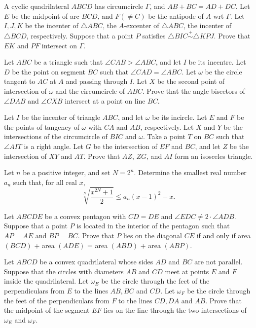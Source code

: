 \documentclass[11pt]{scrartcl}
\begin{document}
\begin{problem}[571352513856417722]
	A cyclic quadrilateral $ABCD$ has circumcircle $\Gamma$, and $AB+BC=AD+DC$. Let $E$ be the midpoint of arc $BCD$, and $F (\neq C)$ be the antipode of $A$ wrt $\Gamma$. Let $I,J,K$ be the incenter of $\triangle ABC$, the $A$-excenter of $\triangle ABC$, the incenter of $\triangle BCD$, respectively.
Suppose that a point $P$ satisfies $\triangle BIC \stackrel{+}{\sim} \triangle KPJ$. Prove that $EK$ and $PF$ intersect on $\Gamma.$
\end{problem}
\begin{problem}[1266870846109464791]
	Let $ABC$ be a triangle such that $\angle CAB > \angle ABC$, and let $I$ be its incentre. Let $D$ be the point on segment $BC$ such that $\angle CAD = \angle ABC$. Let $\omega$ be the circle tangent to $AC$ at $A$ and passing through $I$. Let $X$ be the second point of intersection of $\omega$ and the circumcircle of $ABC$. Prove that the angle bisectors of $\angle DAB$ and $\angle CXB$ intersect at a point on line $BC$.
\end{problem}
\begin{problem}[651490142085731]
	Let $I$ be the incenter of triangle $ABC$, and let $\omega$ be its incircle. Let $E$ and $F$ be the points of tangency of $\omega$ with $CA$ and $AB$, respectively. Let $X$ and $Y$ be the intersections of the circumcircle of $BIC$ and $\omega$. Take a point $T$ on $BC$ such that $\angle AIT$ is a right angle. Let $G$ be the intersection of $EF$ and $BC$, and let $Z$ be the intersection of $XY$ and $AT$. Prove that $AZ$, $ZG$, and $AI$ form an isosceles triangle.
\end{problem}
\begin{problem}[9026100911884959358]
Let $n$ be a positive integer, and set $N=2^{n}$. Determine the smallest real number $a_{n}$ such that, for all real $x$,
\[
\sqrt[N]{\frac{x^{2 N}+1}{2}} \leqslant a_{n}(x-1)^{2}+x .
\]
\end{problem}
\begin{problem}[1336030836839904136]
Let $ABCDE$ be a convex pentagon with $CD= DE$ and $\angle EDC \ne 2 \cdot \angle ADB$.
Suppose that a point $P$ is located in the interior of the pentagon such that $AP =AE$ and $BP= BC$.
Prove that $P$ lies on the diagonal $CE$ if and only if area $(BCD)$ + area $(ADE)$ = area $(ABD)$ + area $(ABP)$.
\end{problem}
\begin{problem}[5062971667185317512]
	Let $ABCD$ be a convex quadrilateral whose sides $AD$ and $BC$ are not parallel. Suppose that the circles with diameters $AB$ and $CD$ meet at points $E$ and $F$ inside the quadrilateral. Let $\omega_E$ be the circle through the feet of the perpendiculars from $E$ to the lines $AB,BC$ and $CD$. Let $\omega_F$ be the circle through the feet of the perpendiculars from $F$ to the lines $CD,DA$ and $AB$. Prove that the midpoint of the segment $EF$ lies on the line through the two intersections of $\omega_E$ and $\omega_F$.
\end{problem}
\end{document}
